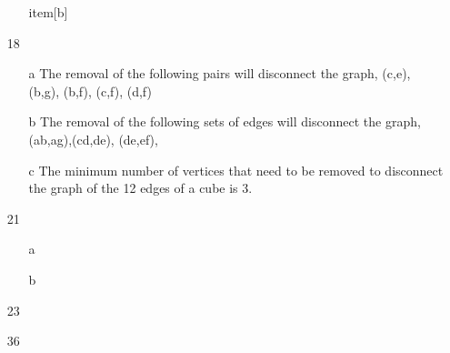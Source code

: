 \documentclass{article}
\begin{document}
\begin{enumerate}
\begin{enumerate}
		item[b]
				      
      		        
      \end{enumerate}
      
      \item[18]
      \begin{enumerate}
      \item[a]
      The removal of the following pairs will disconnect the graph, (c,e),
      (b,g), (b,f), (c,f), (d,f)
      \item[b]
      The removal of the following sets of edges will disconnect the graph,
      (ab,ag),(cd,de), (de,ef),  
      \item[c]
      The minimum number of vertices that need to be removed to disconnect the
      graph of the 12 edges of a cube is 3. 
      \end{enumerate}
      
      \item[21]
      \begin{enumerate}
              \item[a]
              
              \newgame

              \showboard
              \item[b]
      \end{enumerate}
      \item[23]
      
      \item[36]
\end{enumerate}
\end{document}

